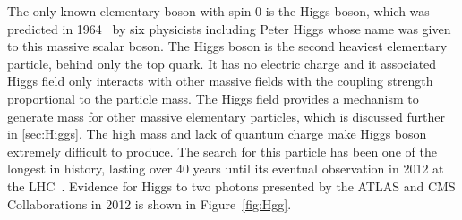 The only known elementary boson with spin 0 is the Higgs boson, which was predicted in 1964~\cite{PhysRevLett.13.321,PhysRevLett.13.508,PhysRevLett.13.585} by six physicists including Peter Higgs whose name was given to this massive scalar boson. The Higgs boson is the second heaviest elementary particle, behind only the top quark. It has no electric charge and it associated Higgs field only interacts with other massive fields with the coupling strength proportional to the particle mass. The Higgs field provides a mechanism to generate mass for other massive elementary particles, which is discussed further in \autoref{sec:Higgs}. The high mass and lack of quantum charge make Higgs boson extremely difficult to produce. The search for this particle has been one of the longest in history, lasting over 40 years until its eventual observation in 2012 at the \ac{LHC}~\cite{ATLAS:2012yve,CMS:2012qbp}. Evidence for Higgs to two photons presented by the \ac{ATLAS} and \ac{CMS} Collaborations in 2012 is shown in Figure~\ref{fig:Hgg}.

